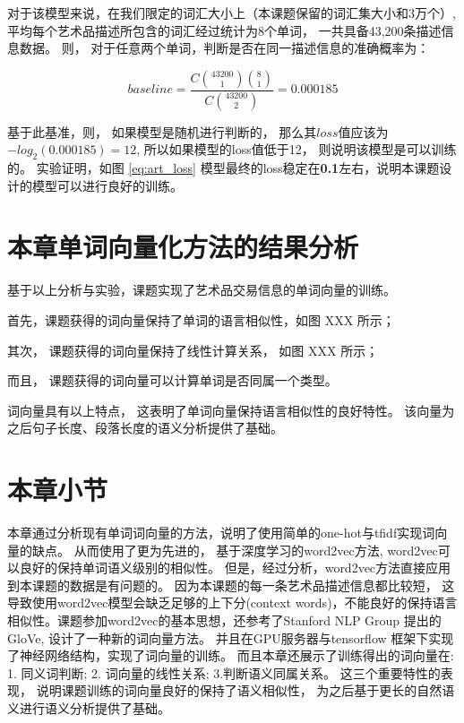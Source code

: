 对于该模型来说，在我们限定的词汇大小上（本课题保留的词汇集大小和3万个）, 平均每个艺术品描述所包含的词汇经过统计为8个单词， 一共具备43,200条描述信息数据。 则， 对于任意两个单词，判断是否在同一描述信息的准确概率为： 

\begin{equation}
baseline = \frac{C{43200 \choose 1} {8 \choose 1}} {C{43200 \choose 2}} = 0.000185
\end{equation}

基于此基准，则， 如果模型是随机进行判断的， 那么其$loss$值应该为 $-log_2(0.000185) = 12$, 所以如果模型的loss值低于12， 则说明该模型是可以训练的。 实验证明，如图 \ref{eq:art_loss} 模型最终的loss稳定在\textbf{0.1}左右，说明本课题设计的模型可以进行良好的训练。 

\section{本章单词向量化方法的结果分析}

基于以上分析与实验，课题实现了艺术品交易信息的单词向量的训练。 

首先，课题获得的词向量保持了单词的语言相似性，如图 XXX 所示； 


其次， 课题获得的词向量保持了线性计算关系， 如图 XXX 所示；

而且， 课题获得的词向量可以计算单词是否同属一个类型。

词向量具有以上特点， 这表明了单词向量保持语言相似性的良好特性。 该向量为之后句子长度、段落长度的语义分析提供了基础。 

\section{本章小节}

本章通过分析现有单词词向量的方法，说明了使用简单的one-hot与tfidf实现词向量的缺点。 从而使用了更为先进的， 基于深度学习的word2vec方法, word2vec可以良好的保持单词语义级别的相似性。 但是，经过分析，word2vec方法直接应用到本课题的数据是有问题的。 因为本课题的每一条艺术品描述信息都比较短， 这导致使用word2vec模型会缺乏足够的上下分(context words)，不能良好的保持语言相似性。课题参加word2vec的基本思想，还参考了Stanford NLP Group 提出的 GloVe, 设计了一种新的词向量方法。 并且在GPU服务器与tensorflow 框架下实现了神经网络结构，实现了词向量的训练。 而且本章还展示了训练得出的词向量在: 1. 同义词判断; 2. 词向量的线性关系; 3.判断语义同属关系。 这三个重要特性的表现， 说明课题训练的词向量良好的保持了语义相似性， 为之后基于更长的自然语义进行语义分析提供了基础。 